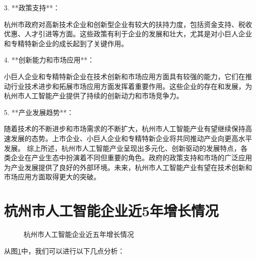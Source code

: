 \documentclass[UTF8,twocolumn]{ctexart}
\begin{document}
3. **政策支持**：

   杭州市政府对高新技术企业和创新型企业有较大的扶持力度，包括资金支持、税收优惠、人才引进等方面。这些政策有利于企业的发展和壮大，尤其是对小巨人企业和专精特新企业的成长起到了关键作用。

4. **创新能力和市场应用**：

   小巨人企业和专精特新企业在技术创新和市场应用方面具有较强的能力，它们在推动行业技术进步和拓展市场应用方面发挥着重要作用。这些企业的存在和发展，为杭州市人工智能产业提供了持续的创新动力和市场竞争力。

5. **产业发展趋势**：

   随着技术的不断进步和市场需求的不断扩大，杭州市人工智能产业有望继续保持高速发展的态势。上市企业、小巨人企业和专精特新企业将共同推动产业向更高水平发展。
综上所述，杭州市人工智能产业呈现出多元化、创新驱动的发展特点，各类企业在产业生态中扮演着不同但重要的角色。政府的政策支持和市场的广泛应用为产业发展提供了良好的外部环境。未来，杭州市人工智能产业有望在技术创新和市场应用方面取得更大的突破。

\section{杭州市人工智能企业近5年增长情况}

%
%
%
\begin{figure}[htbp]
  \centering
  \caption{杭州市人工智能企业近五年增长情况}
  \label{fig:myfig1}
\end{figure}
从图\ref{fig:myfig1}中，我们可以进行以下几点分析：
\end{document}
